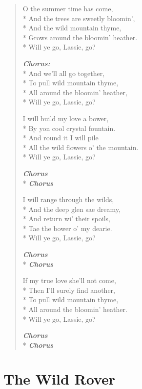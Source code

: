 \documentclass[9pt,twoside]{extarticle}
\makeatletter
\newenvironment{xverse}{
	\begin{verse}
	\fontsize{8.5}{10.5}\selectfont
}{
	\end{verse}
}
\newcommand{\chorusdef}{\textbf{\emph{Chorus:}}\\*}
\newcommand{\chorus@mark}[1][1]{%
\textbf{\emph{Chorus \ifthenelse{\equal{#1}{1}}{}{$\times$ #1}}}%
}
\newcommand{\chorusmark}[1][1]{%
\ifvmode%
\vspace{-0.5\stanzaskip}%
\chorus@mark[#1]%
\vspace{-0.5\stanzaskip}%
\else \\*%
\chorus@mark[#1]%
\fi%
}
\makeatother
\begin{document}
\begin{xverse}
O the summer time has come, \\*
And the trees are sweetly bloomin’, \\*
And the wild mountain thyme, \\*
Grows around the bloomin’ heather. \\*
Will ye go, Lassie, go?

\chorusdef
And we’ll all go together, \\*
To pull wild mountain thyme, \\*
All around the bloomin’ heather, \\*
Will ye go, Lassie, go?

I will build my love a bower, \\*
By yon cool crystal fountain. \\*
And round it I will pile \\*
All the wild flowers o’ the mountain. \\*
Will ye go, Lassie, go?

\chorusmark

I will range through the wilds, \\*
And the deep glen sae dreamy, \\*
And return wi’ their spoils, \\*
Tae the bower o’ my dearie. \\*
Will ye go, Lassie, go?

\chorusmark

If my true love she’ll not come, \\*
Then I’ll surely find another, \\*
To pull wild mountain thyme, \\*
All around the bloomin’ heather. \\*
Will ye go, Lassie, go?

\chorusmark
\end{xverse}

\section{The Wild Rover}
\end{document}
